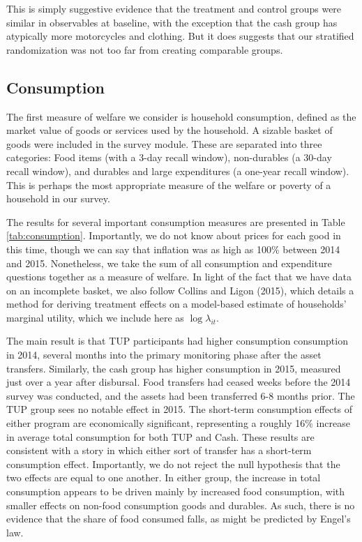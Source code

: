 \documentclass[12pt,article]{article}
\begin{document}
This is simply suggestive evidence that the treatment and control groups were similar
in observables at baseline, with the exception that the cash group has atypically
more motorcycles and clothing. But it does suggests that our stratified randomization
was not too far from creating comparable groups.

\subsection{Consumption}
\label{sec-3-2}

The first measure of welfare we consider is household consumption, defined as the
market value of goods or services used by the household. A sizable basket of goods
were included in the survey module. These are separated into three categories: Food
items (with a 3-day recall window), non-durables (a 30-day recall window), and
durables and large expenditures (a one-year recall window). This is perhaps the most
appropriate measure of the welfare or poverty of a household in our survey. 

The results for several important consumption measures are presented in Table
\ref{tab:consumption}. Importantly, we do not know about prices for each good in this
time, though we can say that inflation was as high as 100\% between 2014 and 2015.
Nonetheless, we take the sum of all consumption and expenditure questions together as
a measure of welfare. In light of the fact that we have data on an incomplete basket, we also
follow Collins and Ligon (2015), which details a method for deriving treatment
effects on a model-based estimate of households' marginal utility, which we include
here as \(\log\lambda_{it}\).

The main result is that TUP participants had higher consumption consumption in 2014,
several months into the primary monitoring phase after the asset transfers.
Similarly, the cash group has higher consumption in 2015, measured just over a year
after disbursal. Food transfers had ceased weeks before the 2014 survey was
conducted, and the assets had been transferred 6-8 months prior. The TUP group sees
no notable effect in 2015. The short-term consumption effects of either program are
economically significant, representing a roughly 16\% increase in average total
consumption for both TUP and Cash. These results are consistent with a story in which
either sort of transfer has a short-term consumption effect. Importantly, we do not
reject the null hypothesis that the two effects are equal to one another. In either
group, the increase in total consumption appears to be driven mainly by increased
food consumption, with smaller effects on non-food consumption goods and durables. As
such, there is no evidence that the share of food consumed falls, as might be
predicted by Engel's law.
\end{document}
